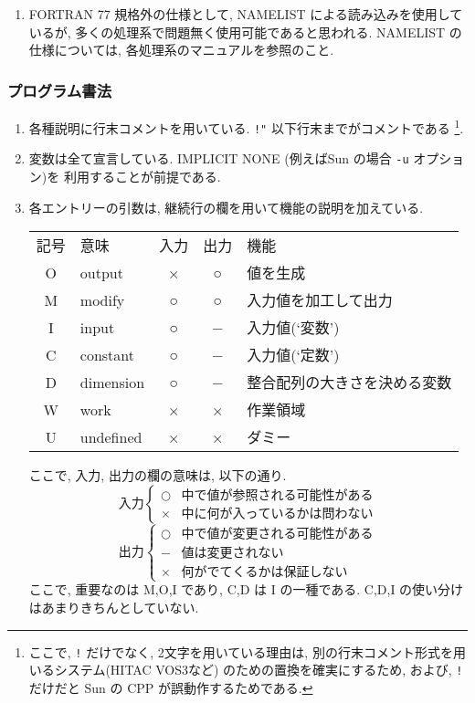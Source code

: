 \begin{enumerate}
\item FORTRAN 77 規格外の仕様として,
  NAMELIST による読み込みを使用しているが,
  多くの処理系で問題無く使用可能であると思われる.
  NAMELIST の仕様については, 各処理系のマニュアルを参照のこと.

\end{enumerate}


\subsubsection{プログラム書法}

\begin{enumerate}
\item 各種説明に行末コメントを用いている. 
  \verb+!"+ 以下行末までがコメントである 
  \footnote{ここで,  \verb+!+ だけでなく, 2文字を用いている理由は, 
            別の行末コメント形式を用いるシステム(HITAC VOS3など)
            のための置換を確実にするため, および,
            \verb+!+ だけだと Sun の CPP が誤動作するためである.}.

\item 変数は全て宣言している. 
  IMPLICIT NONE (例えばSun の場合 {\tt -u} オプション)を
  利用することが前提である.

\item 各エントリーの引数は, 継続行の欄を用いて機能の説明を加えている. 
\begin{center}
    \begin{tabular}{clccl} 
    記号 & 意味      & 入力 & 出力 & 機能     \\
    O    & output    &  ×  &  ○  & 値を生成 \\
    M    & modify    &  ○  &  ○  & 入力値を加工して出力 \\
    I    & input     &  ○  &  −  & 入力値(`変数') \\
    C    & constant  &  ○  &  −  & 入力値(`定数') \\
    D    & dimension &  ○  &  −  & 整合配列の大きさを決める変数 \\
    W    & work      &  ×  &  ×  & 作業領域 \\
    U    & undefined &  ×  &  ×  & ダミー 
    \end{tabular}

ここで, 入力, 出力の欄の意味は, 以下の通り.
\[
    入力 \left\{
    \begin{array}{ll}   
      ○ &  中で値が参照される可能性がある \\
      × &  中に何が入っているかは問わない
    \end{array}  
     \right.
\]
\[
    出力 \left\{
    \begin{array}{ll}   
      ○ &  中で値が変更される可能性がある \\
      − &  値は変更されない \\
      × &  何がでてくるかは保証しない
    \end{array}  
     \right.
\]
ここで, 重要なのは M,O,I であり, C,D は I の一種である.
C,D,I の使い分けはあまりきちんとしていない.
\end{center}



\end{enumerate}
